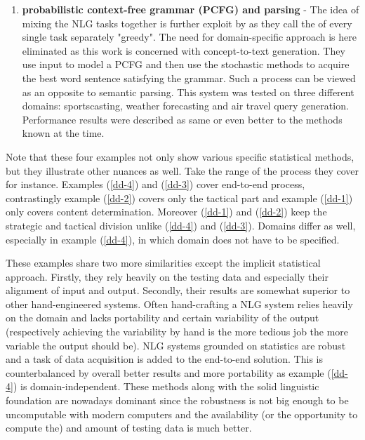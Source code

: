 \begin{enumerate}
	\item \textbf{probabilistic context-free grammar (PCFG) and parsing} - The idea of mixing the NLG tasks together is further exploit by \cite{konstas2013global} as they call the of every single task separately "greedy". The need for domain-specific approach is here eliminated as this work is concerned with concept-to-text generation. They use input to model a PCFG and then use the stochastic methods to acquire the best word sentence satisfying the grammar. Such a process can be viewed as an opposite to semantic parsing. This system was tested on three different domains: sportscasting, weather forecasting and air travel query generation. Performance results were described as same or even better to the methods known at the time.\label{dd-4}
\end{enumerate}
Note that these four examples not only show various specific statistical methods, but they illustrate other nuances as well. Take the range of the process they cover for instance. Examples (\ref{dd-4}) and (\ref{dd-3}) cover end-to-end process, contrastingly example (\ref{dd-2}) covers only the tactical part and example (\ref{dd-1}) only covers content determination. Moreover (\ref{dd-1}) and (\ref{dd-2}) keep the strategic and tactical division unlike (\ref{dd-4}) and (\ref{dd-3}). Domains differ as well, especially in example (\ref{dd-4}), in which domain does not have to be specified.

These examples share two more similarities except the implicit statistical approach. Firstly, they rely heavily on the testing data and especially their alignment of input and output. Secondly, their results are somewhat superior to other hand-engineered systems. Often hand-crafting a NLG system relies heavily on the domain and lacks portability and certain variability of the output (respectively achieving the variability by hand is the more tedious job the more variable the output should be). NLG systems grounded on statistics are robust and a task of data acquisition is added to the end-to-end solution. This is counterbalanced by overall better results and more portability as example (\ref{dd-4}) is domain-independent. These methods along with the solid linguistic foundation are nowadays dominant since the robustness is not big enough to be uncomputable with modern computers and the availability (or the opportunity to compute the) and amount of testing data is much better. 